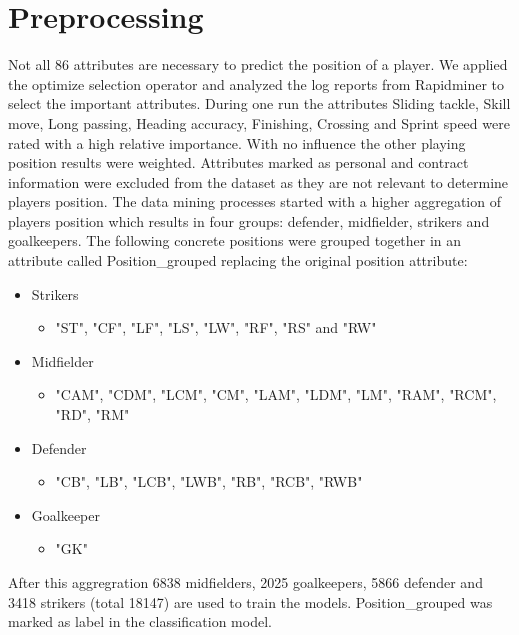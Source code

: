 \section{Preprocessing}
\label{sec:preprocessing}

Not all 86 attributes are necessary to predict the position of a player.
We applied the optimize selection operator and analyzed the log reports from Rapidminer to select the important attributes.
During one run the attributes Sliding tackle, Skill move, Long passing, Heading accuracy, Finishing, Crossing and Sprint speed  were rated with a high relative importance. With no influence the other playing position results were weighted. \newline
Attributes marked as personal and contract information were excluded from the dataset as they are not relevant to determine players position. 
The data mining processes started with a higher aggregation of players position which results in four groups: defender, midfielder, strikers and goalkeepers. The following concrete positions were grouped together in an attribute called Position\_grouped replacing the original position attribute:
\begin{itemize} 
\item Strikers
\begin{itemize}
\item "ST", "CF", "LF", "LS", "LW", "RF", "RS" and "RW"
\end{itemize}
\item Midfielder
\begin{itemize}
\item "CAM", "CDM", "LCM", "CM", "LAM", "LDM", "LM", "RAM", "RCM", "RD", "RM"
\end{itemize}
\item Defender
\begin{itemize} 
\item "CB", "LB", "LCB", "LWB", "RB", "RCB", "RWB"
\end{itemize}
\item Goalkeeper
\begin{itemize}
\item "GK"
\end{itemize}
\end{itemize}

After this aggregration 6838 midfielders, 2025 goalkeepers, 5866 defender and 3418 strikers (total 18147) are used to train the models. Position\_grouped was marked as label in the classification model.


